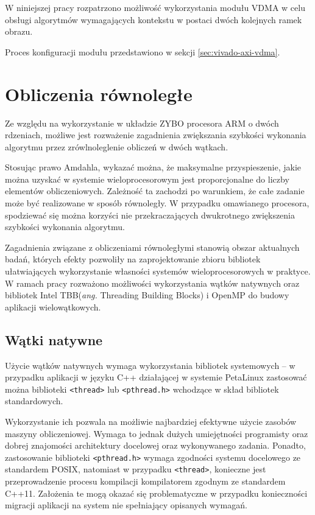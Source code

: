 W niniejszej pracy rozpatrzono możliwość wykorzystania modułu VDMA w celu obsługi algorytmów wymagających kontekstu w postaci dwóch kolejnych ramek obrazu.

Proces konfiguracji modułu przedstawiono w sekcji \ref{sec:vivado-axi-vdma}.

\section{Obliczenia równoległe}
\label{sec:openmp}

Ze względu na wykorzystanie w układzie ZYBO procesora ARM o dwóch rdzeniach, możliwe jest rozważenie zagadnienia zwiększania szybkości wykonania algorytmu przez zrówlnoleglenie obliczeń w dwóch wątkach.

Stosując prawo Amdahla, wykazać można, że maksymalne przyspieszenie, jakie można uzyskać w systemie wieloprocesorowym jest proporcjonalne do liczby elementów obliczeniowych. Zależność ta zachodzi po warunkiem, że całe zadanie może być realizowane w sposób równoległy. W przypadku omawianego procesora, spodziewać się można korzyści nie przekraczających dwukrotnego zwiększenia szybkości wykonania algorytmu.

Zagadnienia związane z obliczeniami równoległymi stanowią obszar aktualnych badań, których efekty pozwoliły na zaprojektowanie zbioru bibliotek ułatwiających wykorzystanie własności systemów wieloprocesorowych w praktyce. W ramach pracy rozważono możliwości wykorzystania wątków natywnych oraz bibliotek Intel TBB(\emph{ang.} Threading Building Blocks) i OpenMP do budowy aplikacji wielowątkowych.

\subsection{Wątki natywne}

Użycie wątków natywnych wymaga wykorzystania bibliotek systemowych -- w przypadku aplikacji w języku C++ działającej w systemie PetaLinux zastosować można biblioteki \texttt{<thread>} lub \texttt{<pthread.h>} wchodzące w skład bibliotek standardowych. \cite{Williams2013}
 
Wykorzystanie ich pozwala na możliwie najbardziej efektywne użycie zasobów maszyny obliczeniowej. Wymaga to jednak dużych umiejętności programisty oraz dobrej znajomości architektury docelowej oraz wykonywanego zadania. Ponadto, zastosowanie biblioteki \texttt{<pthread.h>} wymaga zgodności systemu docelowego ze standardem POSIX, natomiast w przypadku \texttt{<thread>}, konieczne jest przeprowadzenie procesu kompilacji kompilatorem zgodnym ze standardem C++11. Założenia te mogą okazać się problematyczne w przypadku konieczności migracji aplikacji na system nie spełniający opisanych wymagań.

